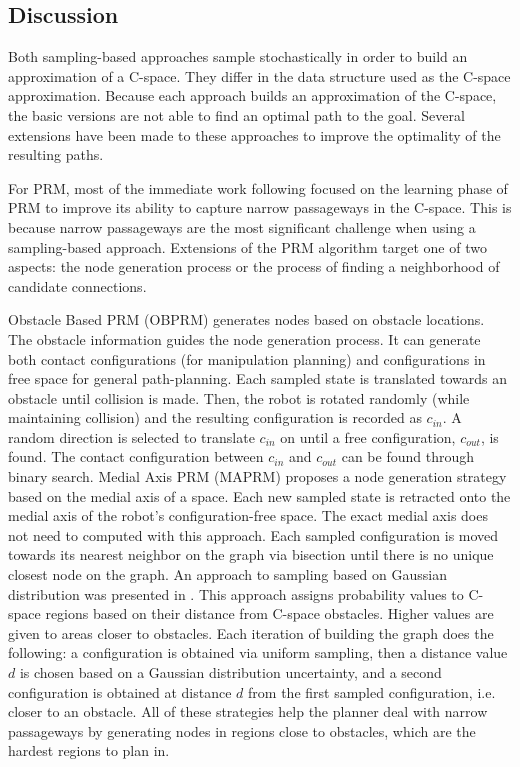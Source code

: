 \documentclass[10pt,conference]{ieeeconf}
\begin{document}
\subsection{Discussion}

Both sampling-based approaches sample stochastically in order to build an approximation of a C-space. They differ in the data structure used as the C-space approximation. Because each approach builds an approximation of the C-space, the basic versions are not able to find an optimal path to the goal. Several extensions have been made to these approaches to improve the optimality of the resulting paths.

For PRM, most of the immediate work following \cite{PRM} focused on the learning phase of PRM to improve its ability to capture narrow passageways in the C-space. This is because narrow passageways are the most significant challenge when using a sampling-based approach. Extensions of the PRM algorithm target one of two aspects: the node generation process or the process of finding a neighborhood of candidate connections. 

Obstacle Based PRM (OBPRM) \cite{amato1998obprm} generates nodes based on obstacle locations. The obstacle information guides the node generation process. It can generate both contact configurations (for manipulation planning) and configurations in free space for general path-planning. Each sampled state is translated towards an obstacle until collision is made. Then, the robot is rotated randomly (while maintaining collision) and the resulting configuration is recorded as $c_{in}$. A random direction is selected to translate $c_{in}$ on until a free configuration, $c_{out}$, is found. The contact configuration between $c_{in}$ and $c_{out}$ can be found through binary search.
Medial Axis PRM (MAPRM) \cite{wilmarth1999maprm} proposes a node generation strategy based on the medial axis of a space. Each new sampled state is retracted onto the medial axis of the robot's configuration-free space. The exact medial axis does not need to computed with this approach. Each sampled configuration is moved towards its nearest neighbor on the graph via bisection until there is no unique closest node on the graph. An approach to sampling based on Gaussian distribution was presented in \cite{boor1999gaussian}. This approach assigns probability values to C-space regions based on their distance from C-space obstacles. Higher values are given to areas closer to obstacles. Each iteration of building the graph does the following: a configuration is obtained via uniform sampling, then a distance value $d$ is chosen based on a Gaussian distribution uncertainty, and a second configuration is obtained at distance $d$ from the first sampled configuration, i.e. closer to an obstacle. All of these strategies help the planner deal with narrow passageways by generating nodes in regions close to obstacles, which are the hardest regions to plan in.
\end{document}
